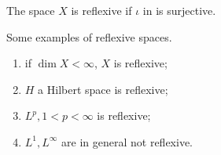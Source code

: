 \documentclass{article}
\begin{document}
\begin{definition}[Reflexive]\nl
    The space $X$ is reflexive if $\iota$ in  is surjective.
\end{definition}

\begin{example}
\label{reflexive examples}
Some examples of reflexive spaces.  
\begin{enumerate}
    \item if $\dim X<\infty$, $X$ is reflexive;
    \item $H$ a Hilbert space is reflexive;
    \item $L^p, 1<p<\infty$ is reflexive;
    \item $L^1, L^\infty$ are in general not reflexive.
\end{enumerate}
\end{example}
\end{document}
